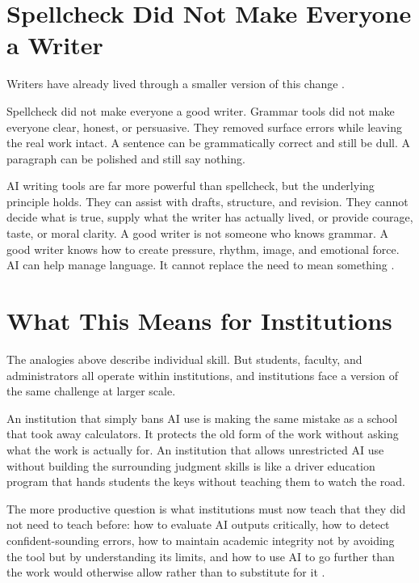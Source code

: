 \documentclass[12pt]{article}
\begin{document}
\section{Spellcheck Did Not Make Everyone a Writer}

Writers have already lived through a smaller version of this change \citep{carr2010shallows}.

Spellcheck did not make everyone a good writer. Grammar tools did not make everyone clear, honest, or persuasive. They removed surface errors while leaving the real work intact. A sentence can be grammatically correct and still be dull. A paragraph can be polished and still say nothing.

AI writing tools are far more powerful than spellcheck, but the underlying principle holds. They can assist with drafts, structure, and revision. They cannot decide what is true, supply what the writer has actually lived, or provide courage, taste, or moral clarity. A good writer is not someone who knows grammar. A good writer knows how to create pressure, rhythm, image, and emotional force. AI can help manage language. It cannot replace the need to mean something \citep{marcus2019rebooting}.

\section{What This Means for Institutions}

The analogies above describe individual skill. But students, faculty, and administrators all operate within institutions, and institutions face a version of the same challenge at larger scale.

An institution that simply bans AI use is making the same mistake as a school that took away calculators. It protects the old form of the work without asking what the work is actually for. An institution that allows unrestricted AI use without building the surrounding judgment skills is like a driver education program that hands students the keys without teaching them to watch the road.

The more productive question is what institutions must now teach that they did not need to teach before: how to evaluate AI outputs critically, how to detect confident-sounding errors, how to maintain academic integrity not by avoiding the tool but by understanding its limits, and how to use AI to go further than the work would otherwise allow rather than to substitute for it \citep{unesco2023guidance, cotton2024chatting}.
\end{document}
